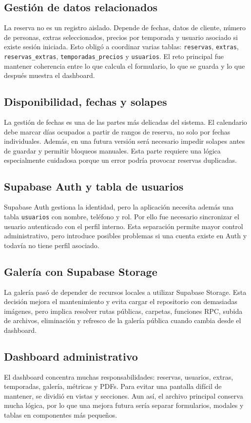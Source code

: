 \documentclass[11pt,a4paper]{article}
\begin{document}
\subsection{Gestión de datos relacionados}
La reserva no es un registro aislado. Depende de fechas, datos de cliente, número de personas, extras seleccionados, precios por temporada y usuario asociado si existe sesión iniciada. Esto obligó a coordinar varias tablas: \texttt{reservas}, \texttt{extras}, \texttt{reservas\_extras}, \texttt{temporadas\_precios} y \texttt{usuarios}. El reto principal fue mantener coherencia entre lo que calcula el formulario, lo que se guarda y lo que después muestra el dashboard.

\subsection{Disponibilidad, fechas y solapes}
La gestión de fechas es una de las partes más delicadas del sistema. El calendario debe marcar días ocupados a partir de rangos de reserva, no solo por fechas individuales. Además, en una futura versión será necesario impedir solapes antes de guardar y permitir bloqueos manuales. Esta parte requiere una lógica especialmente cuidadosa porque un error podría provocar reservas duplicadas.

\subsection{Supabase Auth y tabla de usuarios}
Supabase Auth gestiona la identidad, pero la aplicación necesita además una tabla \texttt{usuarios} con nombre, teléfono y rol. Por ello fue necesario sincronizar el usuario autenticado con el perfil interno. Esta separación permite mayor control administrativo, pero introduce posibles problemas si una cuenta existe en Auth y todavía no tiene perfil asociado.

\subsection{Galería con Supabase Storage}
La galería pasó de depender de recursos locales a utilizar Supabase Storage. Esta decisión mejora el mantenimiento y evita cargar el repositorio con demasiadas imágenes, pero implica resolver rutas públicas, carpetas, funciones RPC, subida de archivos, eliminación y refresco de la galería pública cuando cambia desde el dashboard.

\subsection{Dashboard administrativo}
El dashboard concentra muchas responsabilidades: reservas, usuarios, extras, temporadas, galería, métricas y PDFs. Para evitar una pantalla difícil de mantener, se dividió en vistas y secciones. Aun así, el archivo principal conserva mucha lógica, por lo que una mejora futura sería separar formularios, modales y tablas en componentes más pequeños.
\end{document}
